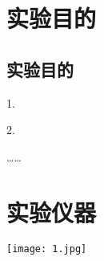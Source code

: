 \fancypage{\fbox}{}
\begin{flushleft}
\section{实验目的}
\subsection{实验目的}
1.

2.

……

\section{实验仪器}
\begin{minipage}[h]
	{1\textwidth}
	\centering
	{\texttt{[image: 1.jpg]}}\\
\end{minipage}
~\\
~\\
~\\
~\\
~\\
~\\


\end{flushleft}	











